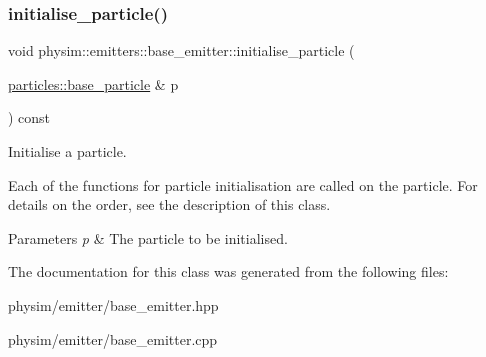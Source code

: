 \subsubsection{\texorpdfstring{initialise\+\_\+particle()}{initialise\_particle()}}
{\footnotesize\ttfamily void physim\+::emitters\+::base\+\_\+emitter\+::initialise\+\_\+particle (\begin{DoxyParamCaption}\item[{\hyperlink{classphysim_1_1particles_1_1base__particle}{particles\+::base\+\_\+particle} \&}]{p }\end{DoxyParamCaption}) const}



Initialise a particle. 

Each of the functions for particle initialisation are called on the particle. For details on the order, see the description of this class. 
\begin{DoxyParams}{Parameters}
{\em p} & The particle to be initialised. \\
\hline
\end{DoxyParams}


The documentation for this class was generated from the following files\+:\begin{DoxyCompactItemize}
\item 
physim/emitter/base\+\_\+emitter.\+hpp\item 
physim/emitter/base\+\_\+emitter.\+cpp\end{DoxyCompactItemize}
